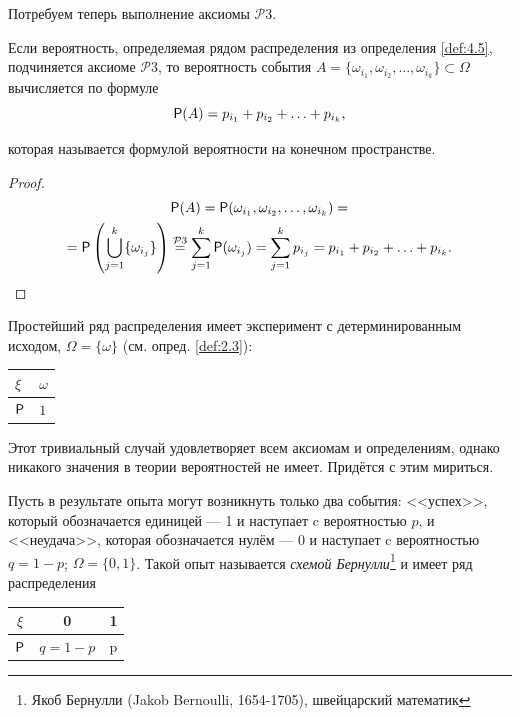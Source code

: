 Потребуем теперь выполнение аксиомы $\mathcal{P}3$.

\begin{deflemma}
	\label{def:4.6}
Если  вероятность, определяемая рядом распределения из определения \ref{def:4.5}, подчиняется аксиоме $\mathcal{P}3$, то вероятность события $A = \{\omega_{i_1} , \omega_{i_2} , \ldots ,  \omega_{i_k} \} \subset \Omega$ вычисляется по формуле
%
$$\P(A) = p_{i_1} + p_{i_2} + \ldots + p_{i_k} ,$$

которая называется формулой вероятности на конечном пространстве.
\end{deflemma}
\begin{proof}
\begin{gather*}
 	\P(A) = \P (\omega_{i_1} , \omega_{i_2} , \ldots , \omega_{i_k}) =\\= \P \left( \bigcup\limits_{j=1}^k \{\omega_{i_j} \} \right) \stackrel{\mathcal{P}3}{=} \sum_{j=1}^{k} \P(\omega_{i_j}) = \sum_{j=1}^{k} p_{i_j} = p_{i_1} + p_{i_2} + \ldots + p_{i_k}.
\end{gather*}
\end{proof} 
\begin{example}
	\label{ex:4.7}
Простейший ряд распределения имеет эксперимент с детерминированным исходом, $\Omega = \{ \omega \}$ (см. опред. \ref{def:2.3}):
\begin{center}
	\begin{tabular}{|l|l|}
		\hline
		$\xi$ & $\omega$  \\ \hline
		$\P$  & $1$  \\ \hline
	\end{tabular}
\end{center}
Этот тривиальный случай удовлетворяет всем аксиомам и определениям, однако никакого значения в теории вероятностей не имеет. Придётся с этим
мириться.
\end{example}
\begin{definition}
	\label{def:4.8}
	Пусть в результате опыта могут возникнуть только
два события: <<успех>>, который обозначается единицей — 1 и наступает c вероятностью $p$, и <<неудача>>, которая обозначается нулём — 0 и наступает c
вероятностью $q = 1−p$; $\Omega = \{0, 1\}$. Такой опыт называется \textit{схемой Бернулли}\footnote{
	Якоб Бернулли (Jakob Bernoulli, 1654-1705), швейцарский математик
}
и имеет ряд распределения

\begin{center}
	\begin{tabular}{|c|c|c|}
		\hline
		$\xi$ & 0 & 1  \\ \hline
		$\P$  & $q=1-p$ & p \\ \hline
	\end{tabular}
\end{center}

\end{definition}

